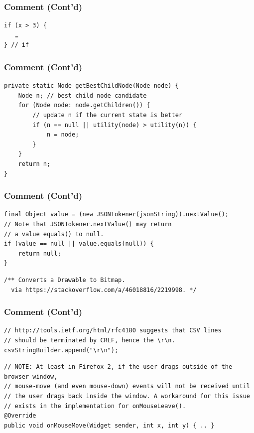 \documentclass{efd-lecture}
\begin{document}
\begin{frame}[fragile]
  \frametitle{Comment (Cont'd)}
  \begin{verbatim}
if (x > 3) {
   …
} // if
  \end{verbatim}
\end{frame}

\begin{frame}[fragile]
  \frametitle{Comment (Cont'd)}
  \begin{verbatim}
private static Node getBestChildNode(Node node) {
    Node n; // best child node candidate
    for (Node node: node.getChildren()) {
        // update n if the current state is better
        if (n == null || utility(node) > utility(n)) {
            n = node;
        }
    }
    return n;
}
  \end{verbatim}
\end{frame}

\begin{frame}[fragile]
  \frametitle{Comment (Cont'd)}
  \begin{verbatim}
final Object value = (new JSONTokener(jsonString)).nextValue();
// Note that JSONTokener.nextValue() may return
// a value equals() to null.
if (value == null || value.equals(null)) {
    return null;
}
  \end{verbatim}
  \begin{verbatim}
/** Converts a Drawable to Bitmap.
  via https://stackoverflow.com/a/46018816/2219998. */
  \end{verbatim}
\end{frame}

\begin{frame}[fragile]
  \frametitle{Comment (Cont'd)}
  \scriptsize
  \begin{verbatim}
// http://tools.ietf.org/html/rfc4180 suggests that CSV lines
// should be terminated by CRLF, hence the \r\n.
csvStringBuilder.append("\r\n");
  \end{verbatim}
  \begin{verbatim}
// NOTE: At least in Firefox 2, if the user drags outside of the browser window,
// mouse-move (and even mouse-down) events will not be received until
// the user drags back inside the window. A workaround for this issue
// exists in the implementation for onMouseLeave().
@Override
public void onMouseMove(Widget sender, int x, int y) { .. }
  \end{verbatim}
\end{frame}
\end{document}
